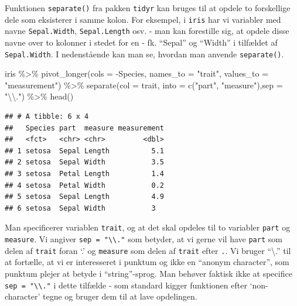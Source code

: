 \documentclass[
]{book}
\newenvironment{Shaded}{\begin{snugshade}}{\end{snugshade}}
\newcommand{\AttributeTok}[1]{\textcolor[rgb]{0.77,0.63,0.00}{#1}}
\newcommand{\FunctionTok}[1]{\textcolor[rgb]{0.00,0.00,0.00}{#1}}
\newcommand{\NormalTok}[1]{#1}
\newcommand{\SpecialCharTok}[1]{\textcolor[rgb]{0.00,0.00,0.00}{#1}}
\newcommand{\StringTok}[1]{\textcolor[rgb]{0.31,0.60,0.02}{#1}}
\begin{document}
Funktionen \texttt{separate()} fra pakken \texttt{tidyr} kan bruges til at opdele to forskellige dele som eksisterer i samme kolon. For eksempel, i \texttt{iris} har vi variabler med navne \texttt{Sepal.Width}, \texttt{Sepal.Length} osv. - man kan forestille sig, at opdele disse navne over to kolonner i stedet for en - fk. ``Sepal'' og ``Width'' i tilfældet af \texttt{Sepal.Width}. I nedenstående kan man se, hvordan man anvende \texttt{separate()}.

\begin{Shaded}
\begin{Highlighting}[]
\NormalTok{iris }\SpecialCharTok{\%\textgreater{}\%}
  \FunctionTok{pivot\_longer}\NormalTok{(}\AttributeTok{cols =} \SpecialCharTok{{-}}\NormalTok{Species, }\AttributeTok{names\_to =} \StringTok{"trait"}\NormalTok{, }\AttributeTok{values\_to =} \StringTok{"measurement"}\NormalTok{) }\SpecialCharTok{\%\textgreater{}\%}
  \FunctionTok{separate}\NormalTok{(}\AttributeTok{col =}\NormalTok{ trait, }\AttributeTok{into =} \FunctionTok{c}\NormalTok{(}\StringTok{"part"}\NormalTok{, }\StringTok{"measure"}\NormalTok{),}\AttributeTok{sep =} \StringTok{"}\SpecialCharTok{\textbackslash{}\textbackslash{}}\StringTok{."}\NormalTok{) }\SpecialCharTok{\%\textgreater{}\%} 
  \FunctionTok{head}\NormalTok{()}
\end{Highlighting}
\end{Shaded}

\begin{verbatim}
## # A tibble: 6 x 4
##   Species part  measure measurement
##   <fct>   <chr> <chr>         <dbl>
## 1 setosa  Sepal Length          5.1
## 2 setosa  Sepal Width           3.5
## 3 setosa  Petal Length          1.4
## 4 setosa  Petal Width           0.2
## 5 setosa  Sepal Length          4.9
## 6 setosa  Sepal Width           3
\end{verbatim}

Man specificerer variablen \texttt{trait}, og at det skal opdeles til to variabler \texttt{part} og \texttt{measure}. Vi angiver \texttt{sep\ =\ "\textbackslash{}\textbackslash{}."} som betyder, at vi gerne vil have \texttt{part} som delen af \texttt{trait} foran `.' og \texttt{measure} som delen af \texttt{trait} efter \texttt{.}. Vi bruger ``\textbackslash.'' til at fortælle, at vi er interesseret i punktum og ikke en ``anonym character'', som punktum plejer at betyde i ``string''-sprog. Man behøver faktisk ikke at specifice \texttt{sep\ =\ "\textbackslash{}\textbackslash{}."} i dette tilfælde - som standard kigger funktionen efter `non-character' tegne og bruger dem til at lave opdelingen.
\end{document}
